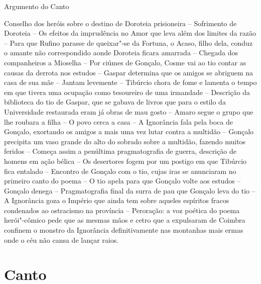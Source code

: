 \mbox{}\vfill
\thispagestyle{empty}
\noindent Argumento do Canto 
\medskip

{\footnotesize\noindent Conselho dos heróis sobre o destino de Doroteia prisioneira --
Sofrimento de Doroteia -- Os efeitos da imprudência no Amor			\index{\Amor}
que leva além dos limites da razão -- Para que Rufino parasse de
queixar"-se da Fortuna, o Acaso, filho dela, conduz o amante não					\index{\Acaso}		\index{\Fortu}
correspondido aonde Doroteia ficara amarrada -- Chegada dos companheiros a Mioselha --
Por ciúmes de Gonçalo, Cosme vai ao tio contar as causas da derrota nos estudos 
-- Gaspar determina que os amigos se abriguem na casa de sua mãe --
Jantam levemente -- Tibúrcio chora de fome e lamenta o tempo em
que tivera uma ocupação como tesoureiro de uma irmandade -- Descrição da biblioteca
do tio de Gaspar, que se gabava de livros que para o estilo da Universidade restaurada
eram já obras de mau gosto -- Amaro segue o grupo que lhe roubara a filha -- O povo
cerca a casa -- A Ignorância fala pela boca de Gonçalo, exortando os amigos
a mais uma vez lutar contra a multidão -- Gonçalo precipita um vaso grande
do alto do sobrado sobre a multidão, fazendo muitos feridos -- Começa assim a penúltima
pragmatografia de guerra, descrição de homens em ação bélica -- Os desertores
fogem por um postigo em que Tibúrcio fica entalado -- Encontro de Gonçalo com o tio,
cujas iras se anunciaram no primeiro canto do poema -- O tio apela para que Gonçalo
volte aos estudos -- Gonçalo denega -- Pragmatografia final da surra de pau que Gonçalo
leva do tio -- A Ignorância goza o Império que ainda tem sobre aqueles espíritos fracos
condenados ao ostracismo na província -- Peroração: a voz poética do poema
herói"-cômico pede que as mesmas mãos e cetro que a expulsaram de Coimbra confinem
o monstro da Ignorância definitivamente nas montanhas mais ermas onde o céu
não cansa de lançar raios. }


\chapter{Canto } 

